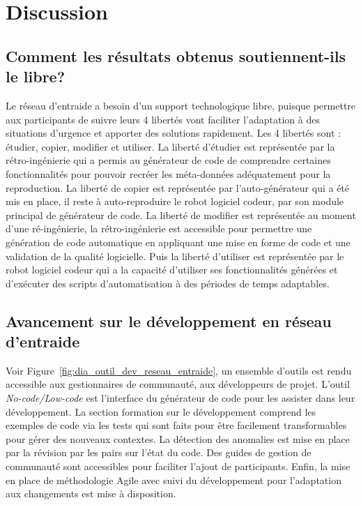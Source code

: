 \section{Discussion}

\subsection{Comment les résultats obtenus soutiennent-ils le libre?}
Le réseau d’entraide a besoin d’un support technologique libre, puisque permettre aux participants de suivre leurs 4 libertés vont faciliter l'adaptation à des situations d’urgence et apporter des solutions rapidement. Les 4 libertés sont : étudier, copier, modifier et utiliser. La liberté d'étudier est représentée par la rétro-ingénierie qui a permis au générateur de code de comprendre certaines fonctionnalités pour pouvoir recréer les méta-données adéquatement pour la reproduction. La liberté de copier est représentée par l’auto-générateur qui a été mis en place, il reste à auto-reproduire le robot logiciel codeur, par son module principal de générateur de code. La liberté de modifier est représentée au moment d'une ré-ingénierie, la rétro-ingénierie est accessible pour permettre une génération de code automatique en appliquant une mise en forme de code et une validation de la qualité logicielle. Puis la liberté d'utiliser est représentée par le robot logiciel codeur qui a la capacité d’utiliser ses fonctionnalités générées et d’exécuter des scripts d’automatisation à des périodes de temps adaptables.

\subsection{Avancement sur le développement en réseau d'entraide}

Voir Figure~\ref{fig:dia_outil_dev_reseau_entraide}, un ensemble d'outils est rendu accessible aux gestionnaires de communauté, aux développeurs de projet. L'outil \textit{No-code/Low-code} est l'interface du générateur de code pour les assister dans leur développement. La section formation sur le développement comprend les exemples de code via les tests qui sont faits pour être facilement transformables pour gérer des nouveaux contextes. La détection des anomalies est mise en place par la révision par les pairs sur l'état du code. Des guides de gestion de communauté sont accessibles pour faciliter l'ajout de participants. Enfin, la mise en place de méthodologie Agile avec suivi du développement pour l'adaptation aux changements est mise à disposition.

